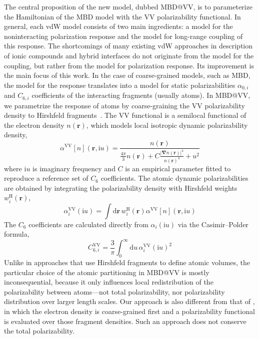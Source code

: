 The central proposition of the new model, dubbed MBD@VV, is to parameterize the Hamiltonian of the MBD model with the VV polarizability functional.
In general, each vdW model consists of two main ingredients: a model for the noninteracting polarization response and the model for long-range coupling of this response.
The shortcomings of many existing vdW approaches in description of ionic compounds and hybrid interfaces do not originate from the model for the coupling, but rather from the model for polarization response.
Its improvement is the main focus of this work.
In the case of coarse-grained models, such as MBD, the model for the response translates into a model for static polarizabilities $\alpha_{0,i}$ and $C_{6,i}$ coefficients of the interacting fragments (usually atoms).
In MBD@VV, we parametrize the response of atoms by coarse-graining the VV polarizability density to Hirshfeld fragments~\citep{HirshfeldTCA77,SatoJCP09,SatoJCP10}.
The VV functional is a semilocal functional of the electron density $n(\mathbf r)$, which models local isotropic dynamic polarizability density,
\begin{equation}
   \alpha^\text{VV}[n](\mathbf r,\mathrm iu)=\frac{n(\mathbf r)}{\frac{4\pi}3n(\mathbf r)+C\frac{{|\boldsymbol\nabla n(\mathbf r)|}^4}{n{(\mathbf r)}^4}+u^2}
   \label{eq:vv-functional}
\end{equation}
where $\mathrm iu$ is imaginary frequency and $C$ is an empirical parameter fitted to reproduce a reference set of $C_6$ coefficients.
The atomic dynamic polarizabilities are obtained by integrating the polarizability density with Hirshfeld weights $w_i^\text{H}(\mathbf r)$,
\begin{equation}
  \alpha_i^\text{VV}(\mathrm iu)=\int\mathrm d\mathbf r\,w_i^\text{H}(\mathbf r)\alpha^\text{VV}[n](\mathbf r,\mathrm iu)
\end{equation}
The $C_6$ coefficients are calculated directly from $\alpha_i(\mathrm iu)$ via the Casimir--Polder formula,
\begin{equation}
  C_{6,i}^\text{VV}=\frac3\pi\int_0^\infty\mathrm du\,\alpha_i^\text{VV}{(\mathrm iu)}^2
\end{equation}
Unlike in approaches that use Hirshfeld fragments to define atomic volumes, the particular choice of the atomic partitioning in MBD@VV is mostly inconsequential, because it only influences local redistribution of the polarizability between atoms---not total polarizability, nor polarizability distribution over larger length scales.
Our approach is also different from that of \citet{SilvestrelliPRL08}, in which the electron density is coarse-grained first and a polarizability functional is evaluated over those fragment densities.
Such an approach does not conserve the total polarizability.

